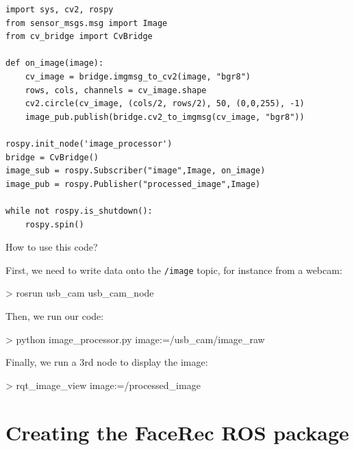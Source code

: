 \documentclass[compress]{beamer}
\begin{document}
\begin{frame}[containsverbatim]{}

\begin{verbatim}
import sys, cv2, rospy
from sensor_msgs.msg import Image
from cv_bridge import CvBridge

def on_image(image):
    cv_image = bridge.imgmsg_to_cv2(image, "bgr8")
    rows, cols, channels = cv_image.shape
    cv2.circle(cv_image, (cols/2, rows/2), 50, (0,0,255), -1)
    image_pub.publish(bridge.cv2_to_imgmsg(cv_image, "bgr8"))

rospy.init_node('image_processor')
bridge = CvBridge()
image_sub = rospy.Subscriber("image",Image, on_image)
image_pub = rospy.Publisher("processed_image",Image)

while not rospy.is_shutdown():
    rospy.spin()
\end{verbatim}

\end{frame}

\begin{frame}[fragile]{How to use this code?}

First, we need to write data onto the \texttt{/image} topic, for instance from a
webcam:

\begin{shcode}
> rosrun usb_cam usb_cam_node
\end{shcode}

\pause

Then, we run our code:

\begin{shcode}
> python image_processor.py image:=/usb_cam/image_raw
\end{shcode}

\pause

Finally, we run a 3rd node to display the image:

\begin{shcode}
> rqt_image_view image:=/processed_image
\end{shcode}

\end{frame}


\section[]{Creating the FaceRec ROS package}
\end{document}
